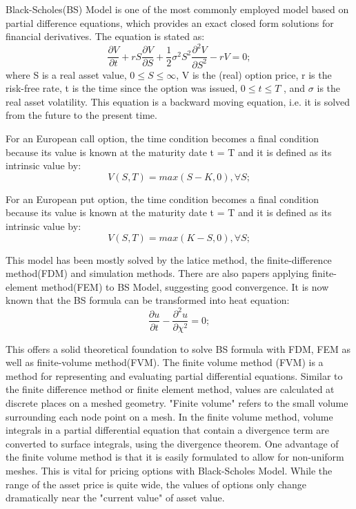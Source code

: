 \documentclass[final]{siamltex}
\begin{document}
Black-Scholes(BS) Model\cite{BS} is one of the most commonly employed model based on partial difference equations, which provides an exact closed form solutions for financial derivatives. The equation is stated as: 
\begin{equation}
\frac{\partial V}{\partial t}+rS \frac{\partial V}{\partial S}+\frac{1}{2} \sigma ^2 S^2 \frac{\partial ^2 V}{\partial S ^2}-rV=0;
\end{equation}
where S is a real asset value, $0 \leq S \leq \infty$, V is the (real) option price, r is the risk-free rate, t is the time since the option was
issued, $0 \leq t \leq T$ , and $\sigma$ is the real asset volatility. This equation is a backward moving equation, i.e. it is solved from
the future to the present time.

For an European call option, the time condition becomes a final condition because its value is known at the maturity date
t = T and it is defined as its intrinsic value by:
\begin{equation}
V(S, T ) = max(S - K, 0), \forall S;
\end{equation}

For an European put option, the time condition becomes a final condition because its value is known at the maturity date
t = T and it is defined as its intrinsic value by:
\begin{equation}
V(S, T ) = max(K - S, 0), \forall S;
\end{equation}

This model has been mostly solved by the latice method\cite{lattice1,lattice2}, the finite-difference method(FDM)\cite{lattice2,FDM1} and simulation methods\cite{longstaff2001valuing,monteC1}. There are also papers applying finite-element method(FEM) to BS Model\cite{FEM1,FEM2}, suggesting good convergence. It is now known that the BS formula can be transformed into heat equation\cite{FEM1}:
\begin{equation}
\frac{\partial u}{\partial t} - \frac{\partial^2 u}{\partial \chi^2} = 0;
\end{equation} 

This offers a solid theoretical foundation to solve BS formula with FDM, FEM as well as finite-volume method(FVM)\cite{patankar1980numerical}. The finite volume method (FVM) is a method for representing and evaluating partial differential equations. Similar to the finite difference method or finite element method, values are calculated at discrete places on a meshed geometry. "Finite volume" refers to the small volume surrounding each node point on a mesh\cite{patankar1980numerical,leveque2002FVM}. In the finite volume method, volume integrals in a partial differential equation that contain a divergence term are converted to surface integrals, using the divergence theorem. One advantage of the finite volume method is that it is easily formulated to allow for non-uniform meshes\cite{versteeg2007FVM}. This is vital for pricing options with Black-Scholes Model. While the range of the asset price is quite wide, the values of options only change dramatically near the "current value" of asset value\cite{JohnHull}.\\
\end{document}

